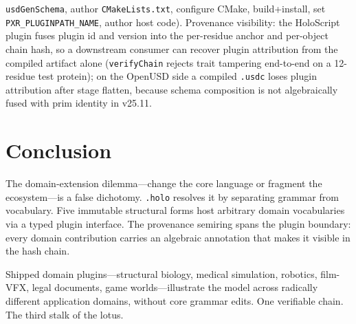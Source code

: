 \documentclass[sigconf,nonacm]{acmart}
\providecommand{\measuredFrom}[1]{}
\newcommand{\holo}{\texttt{.holo}}
\begin{document}
\begin{itemize}
\texttt{usdGenSchema}, author \texttt{CMakeLists.txt}, configure CMake,
build+install, set \texttt{PXR\_PLUGINPATH\_NAME}, author host code).
Provenance visibility: the HoloScript plugin fuses plugin id and
version into the per-residue anchor and per-object chain hash, so a
downstream consumer can recover plugin attribution from the compiled
artifact alone (\texttt{verifyChain} rejects trait tampering
end-to-end on a 12-residue test protein); on the OpenUSD side a
compiled \texttt{.usdc} loses plugin attribution after stage flatten,
because schema composition is not algebraically fused with prim
identity in v25.11.
\measuredFrom{HoloScript/packages/plugins/structural-biology-plugin/src/index.ts}%
\measuredFrom{HoloScript/packages/comparative-benchmarks/usd-comparison/structural-biology/schema.usda}%
\measuredFrom{HoloScript/packages/comparative-benchmarks/src/__tests__/paper-12-structural-biology-comparison.bench.test.ts}%
\measuredFrom{HoloScript/.bench-logs/2026-04-27-paper-12-structural-biology-comparison.md}
\end{itemize}

\section{Conclusion}
\label{sec:conclusion}

The domain-extension dilemma---change the core language or
fragment the ecosystem---is a false dichotomy. \holo{}
resolves it by separating grammar from vocabulary. Five
immutable structural forms host arbitrary domain vocabularies
via a typed plugin interface. The provenance semiring spans
the plugin boundary: every domain contribution carries an
algebraic annotation that makes it visible in the hash chain.

Shipped domain plugins---structural biology, medical
simulation, robotics, film-VFX, legal documents, game
worlds---illustrate the model across radically different
application domains, without core grammar edits. One verifiable chain.
The third stalk of the lotus.



\end{document}
